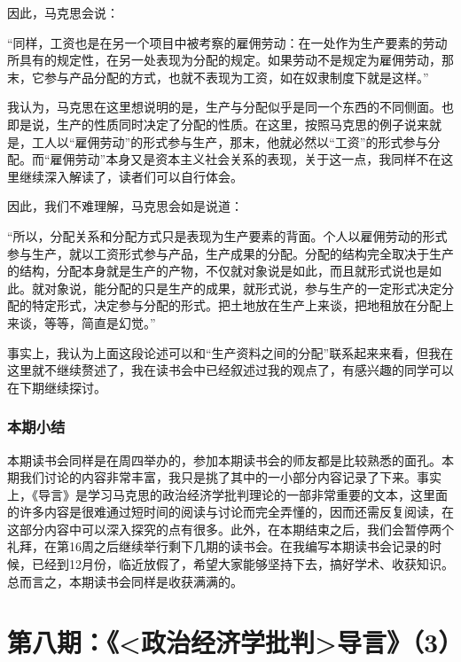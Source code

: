\documentclass[a4paper,twoside,12pt,AutoFakeBold]{ctexart}
\begin{document}
因此，马克思会说：
\begin{adjustwidth}{2em}{2em}
    \qquad\fangsong
    “同样，工资也是在另一个项目中被考察的雇佣劳动：在一处作为生产要素的劳动所具有的规定性，在另一处表现为分配的规定。如果劳动不是规定为雇佣劳动，那末，它参与产品分配的方式，也就不表现为工资，如在奴隶制度下就是这样。”
\end{adjustwidth}
我认为，马克思在这里想说明的是，生产与分配似乎是同一个东西的不同侧面。也即是说，生产的性质同时决定了分配的性质。在这里，按照马克思的例子说来就是，工人以“雇佣劳动”的形式参与生产，那末，他就必然以“工资”的形式参与分配。而“雇佣劳动”本身又是资本主义社会关系的表现，关于这一点，我同样不在这里继续深入解读了，读者们可以自行体会。

因此，我们不难理解，马克思会如是说道：
\begin{adjustwidth}{2em}{2em}
    \qquad\fangsong
    “所以，分配关系和分配方式只是表现为生产要素的背面。个人以雇佣劳动的形式参与生产，就以工资形式参与产品，生产成果的分配。分配的结构完全取决于生产的结构，分配本身就是生产的产物，不仅就对象说是如此，而且就形式说也是如此。就对象说，能分配的只是生产的成果，就形式说，参与生产的一定形式决定分配的特定形式，决定参与分配的形式。把土地放在生产上来谈，把地租放在分配上来谈，等等，简直是幻觉。”
\end{adjustwidth}

\vspace{0.5cm}

事实上，我认为上面这段论述可以和“生产资料之间的分配”联系起来来看，但我在这里就不继续赘述了，我在读书会中已经叙述过我的观点了，有感兴趣的同学可以在下期继续探讨。

\subsubsection{本期小结}
本期读书会同样是在周四举办的，参加本期读书会的师友都是比较熟悉的面孔。本期我们讨论的内容非常丰富，我只是挑了其中的一小部分内容记录了下来。事实上，《导言》是学习马克思的政治经济学批判理论的一部非常重要的文本，这里面的许多内容是很难通过短时间的阅读与讨论而完全弄懂的，因而还需反复阅读，在这部分内容中可以深入探究的点有很多。此外，在本期结束之后，我们会暂停两个礼拜，在第16周之后继续举行剩下几期的读书会。在我编写本期读书会记录的时候，已经到12月份，临近放假了，希望大家能够坚持下去，搞好学术、收获知识。总而言之，本期读书会同样是收获满满的。
\newpage
\section{第八期：《<政治经济学批判>导言》（3）}
\end{document}
